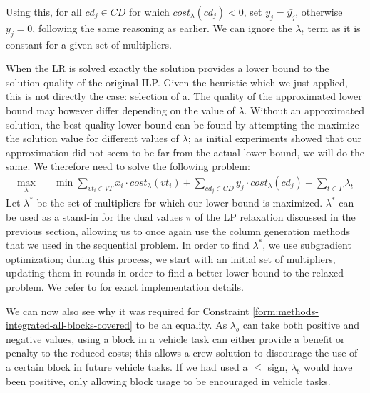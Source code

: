 \documentclass[]{article}
\begin{document}
Using this, for all $cd_j \in CD$ for which $cost_\lambda(cd_j) < 0$, set $y_j = \bar{y_{j}}$, otherwise $y_j = 0$, following the same reasoning as earlier. We can ignore the $\lambda_t$ term as it is constant for a given set of multipliers.

When the LR is solved exactly the solution provides a lower bound to the solution quality of the original ILP. Given the heuristic which we just applied, this is not directly the case: selection of a. The quality of the approximated lower bound may however differ depending on the value of $\lambda$. Without an approximated solution, the best quality lower bound can be found by attempting the maximize the solution value for different values of $\lambda$; as initial experiments showed that our approximation did not seem to be far from the actual lower bound, we will do the same. We therefore need to solve the following problem:
\begin{align}
\max_{\lambda} \quad & \min \sum_{vt_i \in VT} x_{i} \cdot cost_\lambda(vt_i) + \sum_{cd_j \in CD} y_{j} \cdot cost_\lambda(cd_j) + \sum_{t \in T} \lambda_{t}
\end{align}
Let $\lambda^*$ be the set of multipliers for which our lower bound is maximized. $\lambda^*$ can be used as a stand-in for the dual values $\pi$ of the LP relaxation discussed in the previous section, allowing us to once again use the column generation methods that we used in the sequential problem. In order to find $\lambda^*$, we use subgradient optimization; during this process, we start with an initial set of multipliers, updating them in rounds in order to find a better lower bound to the relaxed problem. We refer to \citet{Beasley1993} for exact implementation details. 

We can now also see why it was required for Constraint \ref{form:methods-integrated-all-blocks-covered} to be an equality. As $\lambda_b$ can take both positive and negative values, using a block in a vehicle task can either provide a benefit or penalty to the reduced costs; this allows a crew solution to discourage the use of a certain block in future vehicle tasks. If we had used a $\leq$ sign, $\lambda_b$ would have been positive, only allowing block usage to be encouraged in vehicle tasks. 
\end{document}
